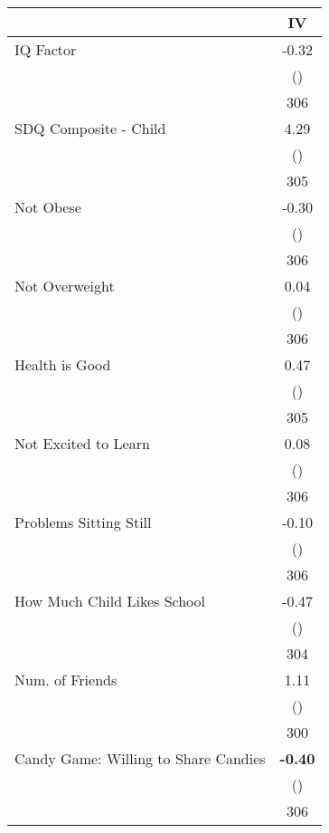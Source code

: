 \begin{tabular}{l c}
\toprule
 & IV \\
\midrule
IQ Factor & -0.32 \\
& () \\
& 306 \\
SDQ Composite - Child & 4.29 \\
& () \\
& 305 \\
Not Obese & -0.30 \\
& () \\
& 306 \\
Not Overweight & 0.04 \\
& () \\
& 306 \\
Health is Good & 0.47 \\
& () \\
& 305 \\
Not Excited to Learn & 0.08 \\
& () \\
& 306 \\
Problems Sitting Still & -0.10 \\
& () \\
& 306 \\
How Much Child Likes School & -0.47 \\
& () \\
& 304 \\
Num. of Friends & 1.11 \\
& () \\
& 300 \\
Candy Game: Willing to Share Candies & \textbf{ -0.40 } \\
& () \\
& 306 \\
\bottomrule
\end{tabular}
